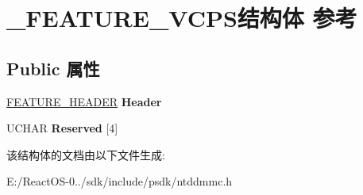 \hypertarget{struct___f_e_a_t_u_r_e___v_c_p_s}{}\section{\+\_\+\+F\+E\+A\+T\+U\+R\+E\+\_\+\+V\+C\+P\+S结构体 参考}
\label{struct___f_e_a_t_u_r_e___v_c_p_s}
\subsection*{Public 属性}
\begin{DoxyCompactItemize}
\item 
\mbox{\label{struct___f_e_a_t_u_r_e___v_c_p_s_aa7c1bcf99fac362b433061cba74c69dc}} 
\hyperlink{struct___f_e_a_t_u_r_e___h_e_a_d_e_r}{F\+E\+A\+T\+U\+R\+E\+\_\+\+H\+E\+A\+D\+ER} {\bfseries Header}
\item 
\mbox{\label{struct___f_e_a_t_u_r_e___v_c_p_s_ac18fae85d1070e8dc51e866d9e937693}} 
U\+C\+H\+AR {\bfseries Reserved} \mbox{[}4\mbox{]}
\end{DoxyCompactItemize}


该结构体的文档由以下文件生成\+:\begin{DoxyCompactItemize}
\item 
E\+:/\+React\+O\+S-\/0../sdk/include/psdk/ntddmmc.\+h\end{DoxyCompactItemize}

